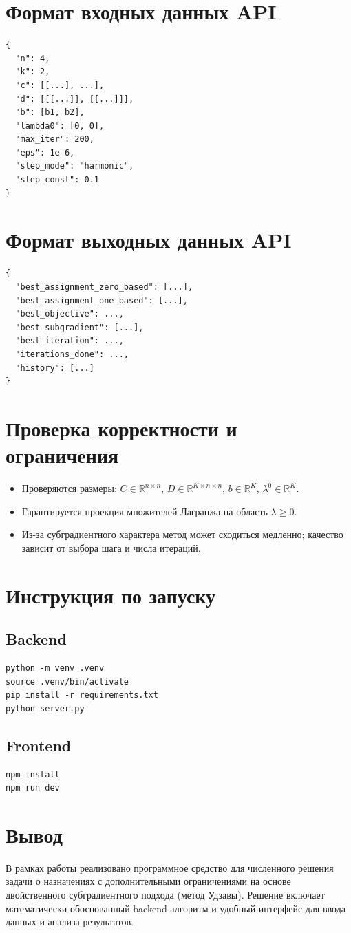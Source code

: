 \documentclass[12pt,a4paper]{article}
\begin{document}
\section{Формат входных данных API}
\begin{verbatim}
{
  "n": 4,
  "k": 2,
  "c": [[...], ...],
  "d": [[[...]], [[...]]],
  "b": [b1, b2],
  "lambda0": [0, 0],
  "max_iter": 200,
  "eps": 1e-6,
  "step_mode": "harmonic",
  "step_const": 0.1
}
\end{verbatim}

\section{Формат выходных данных API}
\begin{verbatim}
{
  "best_assignment_zero_based": [...],
  "best_assignment_one_based": [...],
  "best_objective": ...,
  "best_subgradient": [...],
  "best_iteration": ...,
  "iterations_done": ...,
  "history": [...]
}
\end{verbatim}

\section{Проверка корректности и ограничения}
\begin{itemize}
  \item Проверяются размеры: $C\in\mathbb{R}^{n\times n}$, $D\in\mathbb{R}^{K\times n\times n}$, $b\in\mathbb{R}^{K}$, $\lambda^0\in\mathbb{R}^{K}$.
  \item Гарантируется проекция множителей Лагранжа на область $\lambda\ge 0$.
  \item Из-за субградиентного характера метод может сходиться медленно; качество зависит от выбора шага и числа итераций.
\end{itemize}

\section{Инструкция по запуску}
\subsection*{Backend}
\begin{verbatim}
python -m venv .venv
source .venv/bin/activate
pip install -r requirements.txt
python server.py
\end{verbatim}

\subsection*{Frontend}
\begin{verbatim}
npm install
npm run dev
\end{verbatim}

\section{Вывод}
В рамках работы реализовано программное средство для численного решения задачи о назначениях с дополнительными ограничениями на основе двойственного субградиентного подхода (метод Удзавы). Решение включает математически обоснованный backend-алгоритм и удобный интерфейс для ввода данных и анализа результатов.
\end{document}
